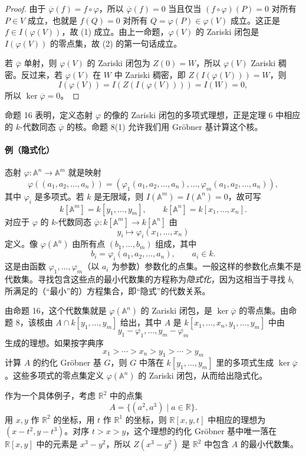 \begin{proof}
	由于 $\overline\varphi(f)=f\circ\varphi$，所以 $\overline\varphi(f)=0$ 当且仅当 $(f\circ\varphi)(P)=0$ 对所有 $P\in V$ 成立，也就是 $f(Q)=0$ 对所有 $Q=\varphi(P)\in\varphi(V)$ 成立。这正是 $f\in I(\varphi(V))$，故 (1) 成立。由上一命题，$\varphi(V)$ 的 Zariski 闭包是 $I(\varphi(V))$ 的零点集，故 (2) 的第一句话成立。
	
	若 $\overline\varphi$ 单射，则 $\varphi(V)$ 的 Zariski 闭包为 $Z(0)=W$，所以 $\varphi(V)$ Zariski 稠密。反过来，若 $\varphi(V)$ 在 $W$ 中 Zariski 稠密，即 $Z(I(\varphi(V)))=W$，则
	\[
	I(\varphi(V))=I(Z(I(\varphi(V))))=I(W)=0,
	\]
	所以 $\ker\overline\varphi=0$。
\end{proof}

命题 16 表明，定义态射 $\varphi$ 的像的 Zariski 闭包的多项式理想，正是定理 6 中相应的 $k$-代数同态 $\overline\varphi$ 的核。命题 8(1) 允许我们用 Gröbner 基计算这个核。

\paragraph{例（隐式化）}
态射 $\varphi:\mathbb A^n\to\mathbb A^m$ 就是映射
\[
\varphi((a_1,a_2,\ldots,a_n))=(\varphi_1(a_1,a_2,\ldots,a_n),\ldots,\varphi_m(a_1,a_2,\ldots,a_n)),
\]
其中 $\varphi_i$ 是多项式。若 $k$ 是无限域，则 $I(\mathbb A^m)=I(\mathbb A^n)=0$，故可写
\[
k[\mathbb A^m]=k[y_1,\ldots,y_m],\qquad k[\mathbb A^n]=k[x_1,\ldots,x_n].
\]
对应于 $\varphi$ 的 $k$-代数同态 $\overline\varphi:k[\mathbb A^m]\to k[\mathbb A^n]$ 由
\[
y_i\longmapsto \varphi_i(x_1,\ldots,x_n)
\]
定义。像 $\varphi(\mathbb A^n)$ 由所有点 $(b_1,\ldots,b_m)$ 组成，其中
\[
b_i=\varphi_i(a_1,a_2,\ldots,a_n),\qquad a_i\in k.
\]
这是由函数 $\varphi_1,\ldots,\varphi_m$（以 $a_i$ 为参数）参数化的点集。一般这样的参数化点集不是代数集。寻找包含这些点的最小代数集的方程称为\emph{隐式化}，因为这相当于寻找 $b_i$ 所满足的（“最小”的）方程集合，即“隐式”的代数关系。

由命题 16，这个代数集就是 $\varphi(\mathbb A^n)$ 的 Zariski 闭包，是 $\ker\overline\varphi$ 的零点集。由命题 8，该核由 $A\cap k[y_1,\ldots,y_m]$ 给出，其中 $A$ 是 $k[x_1,\ldots,x_n,y_1,\ldots,y_m]$ 中由
\[
y_1-\varphi_1,\ldots,y_m-\varphi_m
\]
生成的理想。如果按字典序
\[
x_1>\cdots>x_n>y_1>\cdots>y_m
\]
计算 $A$ 的约化 Gröbner 基 $G$，则 $G$ 中落在 $k[y_1,\ldots,y_m]$ 里的多项式生成 $\ker\overline\varphi$。这些多项式的零点集定义 $\varphi(\mathbb A^n)$ 的 Zariski 闭包，从而给出隐式化。

作为一个具体例子，考虑 $\mathbb R^2$ 中的点集
\[
A=\{(a^2,a^3)\mid a\in\mathbb R\}.
\]
用 $x,y$ 作 $\mathbb R^2$ 的坐标，用 $t$ 作 $\mathbb R^1$ 的坐标，则 $\mathbb R[x,y,t]$ 中相应的理想为 $(x-t^2,y-t^3)$。对序 $t>x>y$，这个理想的约化 Gröbner 基中唯一落在 $\mathbb R[x,y]$ 中的元素是 $x^3-y^2$，所以 $Z(x^3-y^2)$ 是 $\mathbb R^2$ 中包含 $A$ 的最小代数集。

